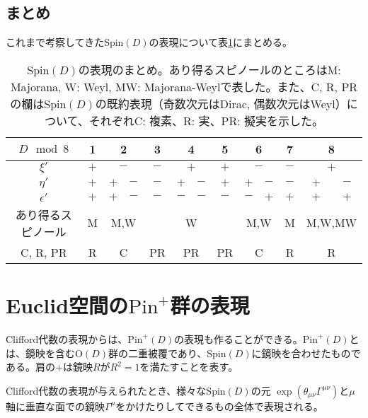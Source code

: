 \documentclass[12pt,a4paper]{jlreq}
\newcommand{\Pin}{\mathrm{Pin}^{+}}
\begin{document}
\subsection{まとめ}
これまで考察してきたSpin$(D)$の表現について表\ref{SpinDrep}にまとめる。
\begin{table}[htb]
  \begin{center}
    \begin{tabular}{|c|c|c|c|c|c|c|c|c|c|c|c|c|}\hline
      $D \mod 8$ & 1 & \multicolumn{2}{|c|}{2} & 3 & \multicolumn{2}{|c|}{4} & 5 & \multicolumn{2}{|c|}{6} & 7 & \multicolumn{2}{|c|}{8} \\ \hline
      $\xi'$ & $+$ & \multicolumn{2}{|c|}{$-$} & $-$ & \multicolumn{2}{|c|}{$+$} & $+$ & \multicolumn{2}{|c|}{$-$} & $-$ & \multicolumn{2}{|c|}{$+$} \\\hline
      $\eta'$ & $+$ & $+$ & $-$ &  $-$ & $+$ & $-$ & $+$ & $+$ & $-$ & $-$ & $+$ & $-$ \\ \hline
      $\epsilon'$ & $+$ & $+$ & $-$ & $-$ & $-$ & $-$ & $-$ & $-$ & $+$ & $+$ & $+$ & $+$ \\ \hline
      あり得るスピノール & M & \multicolumn{2}{|c|}{M,W} &  & \multicolumn{2}{|c|}{W} &  & \multicolumn{2}{|c|}{M,W} & M & \multicolumn{2}{|c|}{M,W,MW} \\ \hline
      C, R, PR & R & \multicolumn{2}{|c|}{C} & PR & \multicolumn{2}{|c|}{PR} & PR & \multicolumn{2}{|c|}{C} & R & \multicolumn{2}{|c|}{R} \\ \hline
    \end{tabular}
  \end{center} 
  \caption{Spin$(D)$の表現のまとめ。あり得るスピノールのところはM: Majorana, W: Weyl, MW: Majorana-Weylで表した。また、C, R, PRの欄はSpin$(D)$の既約表現（奇数次元はDirac, 偶数次元はWeyl）について、それぞれC: 複素、R: 実、PR: 擬実を示した。}
  \label{SpinDrep}
\end{table}

\section{Euclid空間の$\Pin$群の表現}
Clifford代数の表現からは、$\Pin(D)$の表現も作ることができる。$\Pin(D)$とは、鏡映を含むO$(D)$群の二重被覆であり、Spin$(D)$に鏡映を合わせたものである。肩の$+$は鏡映$R$が$R^2=1$を満たすことを表す。

Clifford代数の表現が与えられたとき、様々なSpin$(D)$の元
$\exp(\theta_{\mu\nu}\Gamma^{\mu\nu})$と$\mu$軸に垂直な面での鏡映$\Gamma^{\mu}$をかけたりしてできるもの全体で表現される。
\end{document}
